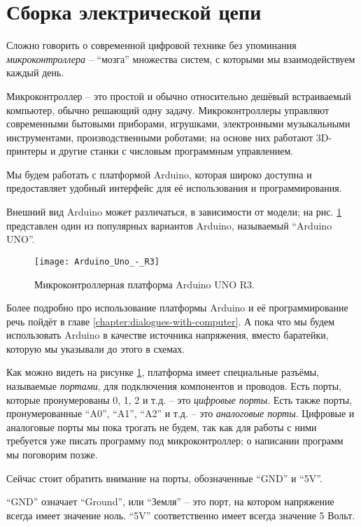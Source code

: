 \documentclass[../sparc.tex]{subfiles}
\begin{document}
\section{Сборка электрической цепи}

Сложно говорить о современной цифровой технике без упоминания
\emph{микроконтроллера} -- ``мозга'' множества систем, с которыми мы
взаимодействуем каждый день.

Микроконтроллер -- это простой и обычно относительно дешёвый встраиваемый
компьютер, обычно решающий одну задачу.  Микроконтроллеры управляют современными
бытовыми приборами, игрушками, электронными музыкальными инструментами,
производственными роботами; на основе них работают 3D-принтеры и другие станки с
числовым программным управлением.

Мы будем работать с платформой Arduino, которая широко доступна и предоставляет
удобный интерфейс для её использования и программирования.

Внешний вид Arduino может различаться, в зависимости от модели; на
рис. \ref{fig:arduino-uno-r3} представлен один из популярных вариантов Arduino,
называемый ``Arduino UNO''.

\begin{figure}[ht]
  \centering
  \texttt{[image: Arduino\_Uno\_-\_R3]}
  \caption{Микроконтроллерная платформа Arduino UNO R3.}
  \label{fig:arduino-uno-r3}
\end{figure}

Более подробно про использование платформы Arduino и её программирование речь
пойдёт в главе \ref{chapter:dialogues-with-computer}.  А пока что мы будем
использовать Arduino в качестве источника напряжения, вместо баратейки, которую
мы указывали до этого в схемах.

Как можно видеть на рисунке \ref{fig:arduino-uno-r3}, платформа имеет
специальные разъёмы, называемые \emph{портами}, для подключения компонентов и
проводов.  Есть порты, которые пронумерованы 0, 1, 2 и т.д. -- это \emph{цифровые
порты}.  Есть также порты, пронумерованные ``A0'', ``A1'', ``A2'' и т.д. -- это
\emph{аналоговые порты}.  Цифровые и аналоговые порты мы пока трогать не будем,
так как для работы с ними требуется уже писать программу под микроконтроллер; о
написании программ мы поговорим позже.

Сейчас стоит обратить внимание на порты, обозначенные ``GND'' и ``5V''.

``GND'' означает ``Ground'', или ``Земля'' -- это порт, на котором напряжение
всегда имеет значение ноль. ``5V'' соответственно имеет всегда значение 5 Вольт.
\end{document}
